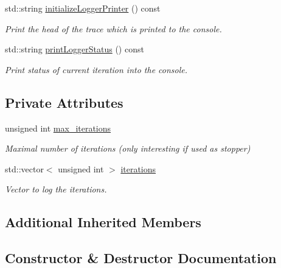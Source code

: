 \begin{DoxyCompactItemize}
std\+::string \mbox{\hyperlink{classlogger_1_1_iteration_logger_ac4ba1eb6419eef2a3c21e9a4323aec1c}{initialize\+Logger\+Printer}} () const
\begin{DoxyCompactList}\small\item\em Print the head of the trace which is printed to the console. \end{DoxyCompactList}\item 
std\+::string \mbox{\hyperlink{classlogger_1_1_iteration_logger_ac3c13bef35391c0408eb196d01b2a286}{print\+Logger\+Status}} () const
\begin{DoxyCompactList}\small\item\em Print status of current iteration into the console. \end{DoxyCompactList}\end{DoxyCompactItemize}
\subsection*{Private Attributes}
\begin{DoxyCompactItemize}
\item 
unsigned int \mbox{\hyperlink{classlogger_1_1_iteration_logger_a3fe389ce81d0790729b59b96414a3909}{max\+\_\+iterations}}
\begin{DoxyCompactList}\small\item\em Maximal number of iterations (only interesting if used as stopper) \end{DoxyCompactList}\item 
std\+::vector$<$ unsigned int $>$ \mbox{\hyperlink{classlogger_1_1_iteration_logger_a7c9d7b0bd792a93a6dd5d9601a10a9b4}{iterations}}
\begin{DoxyCompactList}\small\item\em Vector to log the iterations. \end{DoxyCompactList}\end{DoxyCompactItemize}
\subsection*{Additional Inherited Members}


\subsection{Constructor \& Destructor Documentation}
\mbox{\label{classlogger_1_1_iteration_logger_a571269a473e45ed773685092fab123c6}} 
